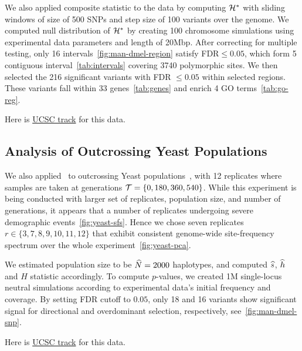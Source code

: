 We also applied composite statistic to the \dmel data by computing ${\cal H}^*$ with 
sliding windows of size of 500 SNPs and step size of 100  variants over the 
genome.
We computed null distribution of ${\cal H}^*$ by creating 100 chromosome simulations 
using experimental data parameters and length of 20Mbp. After correcting for 
multiple testing, only 16 intervals~\ref{fig:man-dmel-region} satisfy 
FDR$\le0.05$, which form 5 contiguous interval~\ref{tab:intervals} covering 
3740 polymorphic sites. We then selected the 216 significant variants with FDR 
$\le0.05$ within selected regions. These variants fall within 33 
genes~\ref{tab:genes} and enrich 4 GO terms~\ref{tab:go-reg}. 


Here is 
\href{https://genome.ucsc.edu/cgi-bin/hgTracks?hgS_doOtherUser=submit&hgS_otherUserName=airanmehr&hgS_otherUserSessionName=Dmel\%20EE\%20HotCold}{UCSC
 track} for this data.

\subsection{Analysis of Outcrossing Yeast Populations}
We also applied \comale\ to outcrossing Yeast 
populations~\cite{burke2014standing}, with 12 replicates where samples are 
taken at generations ${\cal T}=\{0,180,360,540\}$. While this experiment is being 
conducted with larger set of replicates, population size, and number of 
generations, it appears that a number of replicates undergoing severe 
demographic events~\ref{fig:yeast-sfs}. Hence we chose seven replicates 
$r\in\{3,7,8,9,10,11,12\}$ that exhibit consistent genome-wide site-frequency 
spectrum over the whole experiment~\ref{fig:yeast-pca}.

We estimated population size to be $\widehat{N}=2000$ haplotypes, and computed $\widehat{s}$, 
$\widehat{h}$ and $H$ statistic accordingly. To compute $p$-values, we created 1M 
single-locus neutral simulations according to experimental data's initial 
frequency and coverage. By setting FDR cutoff to $0.05$, only 18 and 16 
variants 
show significant signal for directional and overdominant selection, 
respectively, see~\ref{fig:man-dmel-snp}.

Here is 
\href{https://genome.ucsc.edu/cgi-bin/hgTracks?hgS_doOtherUser=submit\&hgS_otherUserName=airanmehr\&hgS_otherUserSessionName=Yeast\%20EE}{UCSC
 track} for this data.

